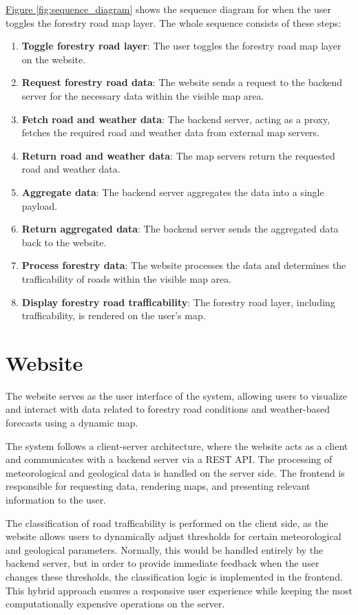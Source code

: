 \hyperref[fig:sequence_diagram]{Figure \ref*{fig:sequence_diagram}} shows the sequence diagram for when the user toggles the forestry road map layer. The whole sequence consists of these steps:
\begin{enumerate}
    \item \textbf{Toggle forestry road layer}: The user toggles the forestry road map layer on the website.
    \item \textbf{Request forestry road data}: The website sends a request to the backend server for the necessary data within the visible map area.
    \item \textbf{Fetch road and weather data}: The backend server, acting as a proxy, fetches the required road and weather data from external map servers.
    \item \textbf{Return road and weather data}: The map servers return the requested road and weather data.
    \item \textbf{Aggregate data}: The backend server aggregates the data into a single payload.
    \item \textbf{Return aggregated data}: The backend server sends the aggregated data back to the website.
    \item \textbf{Process forestry data}: The website processes the data and determines the trafficability of roads within the visible map area.
    \item \textbf{Display forestry road trafficability}: The forestry road layer, including trafficability, is rendered on the user's map.
\end{enumerate}

\section{Website}

The website serves as the user interface of the system, allowing users to visualize and interact with data related to forestry road conditions and weather-based forecasts using a dynamic map.

The system follows a client-server architecture, where the website acts as a client and communicates with a backend server via a REST API. The processing of meteorological and geological data is handled on the server side. The frontend is responsible for requesting data, rendering maps, and presenting relevant information to the user.

The classification of road trafficability is performed on the client side, as the website allows users to dynamically adjust thresholds for certain meteorological and geological parameters. Normally, this would be handled entirely by the backend server, but in order to provide immediate feedback when the user changes these thresholds, the classification logic is implemented in the frontend. This hybrid approach ensures a responsive user experience while keeping the most computationally expensive operations on the server.

